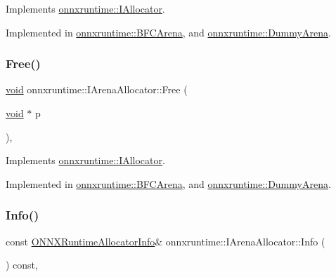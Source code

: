 Implements \mbox{\hyperlink{classonnxruntime_1_1IAllocator_a765590df724d3e7805c1dddbfe290b11}{onnxruntime\+::\+I\+Allocator}}.



Implemented in \mbox{\hyperlink{classonnxruntime_1_1BFCArena_a1e4bda05da04e05e5a9a58c3839e2a14}{onnxruntime\+::\+B\+F\+C\+Arena}}, and \mbox{\hyperlink{classonnxruntime_1_1DummyArena_a44c2bb22792ce63e5d7bfa4b3e03d968}{onnxruntime\+::\+Dummy\+Arena}}.

\mbox{\label{classonnxruntime_1_1IArenaAllocator_a3341fde74c8461678359fb903fe78df3}} 
\subsubsection{\texorpdfstring{Free()}{Free()}}
{\footnotesize\ttfamily \mbox{\hyperlink{mlasi_8h_a88f941d423cb2a819b70a1358982b1a6}{void}} onnxruntime\+::\+I\+Arena\+Allocator\+::\+Free (\begin{DoxyParamCaption}\item[{\mbox{\hyperlink{mlasi_8h_a88f941d423cb2a819b70a1358982b1a6}{void}} $\ast$}]{p }\end{DoxyParamCaption})\hspace{0.3cm}{\ttfamily [override]}, {}}



Implements \mbox{\hyperlink{classonnxruntime_1_1IAllocator_aeab273380d08b613b584c9e50deeb5f9}{onnxruntime\+::\+I\+Allocator}}.



Implemented in \mbox{\hyperlink{classonnxruntime_1_1BFCArena_a92b868aa0f335eafb2ae3542aa87b569}{onnxruntime\+::\+B\+F\+C\+Arena}}, and \mbox{\hyperlink{classonnxruntime_1_1DummyArena_a58196d32ed10a9d9aba3681457ec982d}{onnxruntime\+::\+Dummy\+Arena}}.

\mbox{\label{classonnxruntime_1_1IArenaAllocator_a4eb52bb1236cf59aec91161156286ba0}} 
\subsubsection{\texorpdfstring{Info()}{Info()}}
{\footnotesize\ttfamily const \mbox{\hyperlink{structONNXRuntimeAllocatorInfo}{O\+N\+N\+X\+Runtime\+Allocator\+Info}}\& onnxruntime\+::\+I\+Arena\+Allocator\+::\+Info (\begin{DoxyParamCaption}{ }\end{DoxyParamCaption}) const\hspace{0.3cm}{\ttfamily [override]}, {}}



